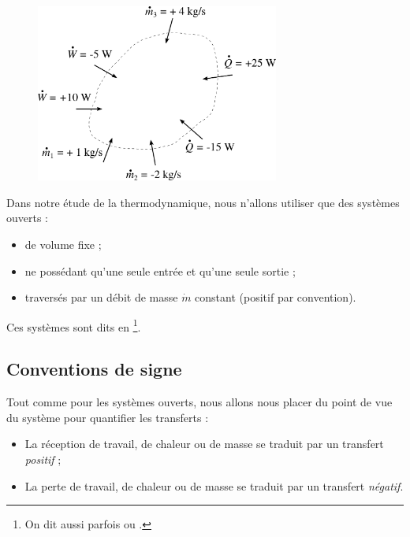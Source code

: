 		\begin{figure}
			\begin{center}
				\includegraphics[width=8cm]{images/convention_systeme_ouvert.png}
			\end{center}
			\label{fig_systeme_ouvert}
		\end{figure}

		Dans notre étude de la thermodynamique, nous n’allons utiliser que des systèmes ouverts :
		\begin{itemize}
			\item de volume fixe ;
			\item ne possédant qu’une seule entrée et qu’une seule sortie ;
			\item traversés par un débit de masse $\dot m$ constant (positif par convention).
		\end{itemize}
		Ces systèmes sont dits en \footnote{On dit aussi parfois  ou .}.

	\subsection{Conventions de signe}

		Tout comme pour les systèmes ouverts, nous allons nous placer du point de vue du système pour quantifier les transferts :
			\begin{itemize}
				\item La réception de travail, de chaleur ou de masse se traduit par un transfert \emph{positif} ;
				\item La perte de travail, de chaleur ou de masse se traduit par un transfert \emph{négatif}.
			\end{itemize}
		
